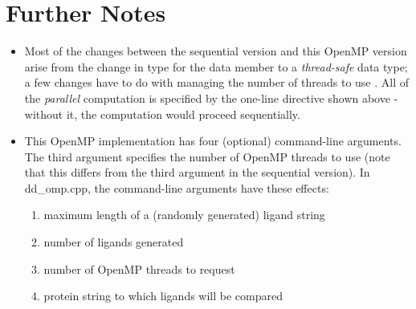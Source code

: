 \documentclass[letterpaper,10pt,openany,oneside]{sphinxmanual}
\begin{document}
\section{Further Notes}
\label{openmp/openmp:further-notes}\label{openmp/openmp:tbb}\begin{itemize}
\item {} 
Most of the changes between the sequential version and this OpenMP version arise from the change in type for the data member  to a \emph{thread-safe} data type; a few changes have to do with managing the number of threads to use . All of the \emph{parallel} computation is specified by the one-line  directive shown above - without it, the computation would proceed sequentially.

\item {} 
This OpenMP implementation has four (optional) command-line arguments.  The third argument specifies the number of OpenMP threads to use (note that this differs from the third argument in the sequential version). In dd\_omp.cpp, the command-line arguments have these effects:
\begin{enumerate}
\item {} 
maximum length of a (randomly generated) ligand string

\item {} 
number of ligands generated

\item {} 
number of OpenMP threads to request

\item {} 
protein string to which ligands will be compared

\end{enumerate}

\end{itemize}
\end{document}

